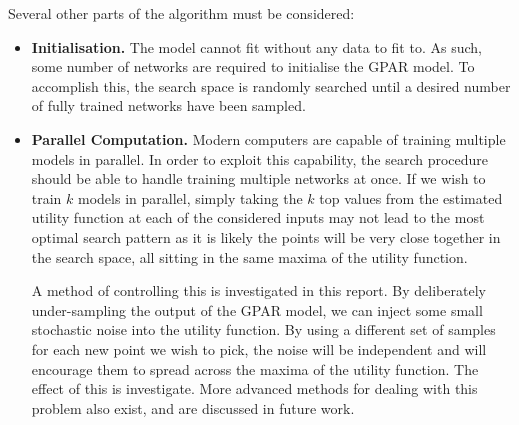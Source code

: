 Several other parts of the algorithm must be considered:
\begin{itemize}
	\item \textbf{Initialisation.} The model cannot fit without any data to fit to. As such, some number of networks are required to initialise the GPAR model. To accomplish this, the search space is randomly searched until a desired number of fully trained networks have been sampled.
	
	\item \textbf{Parallel Computation.} Modern computers are capable of training multiple models in parallel. In order to exploit this capability, the search procedure should be able to handle training multiple networks at once. If we wish to train \( k \) models in parallel, simply taking the \( k \) top values from the estimated utility function at each of the considered inputs may not lead to the most optimal search pattern as it is likely the points will be very close together in the search space, all sitting in the same maxima of the utility function. 
	
	A method of controlling this is investigated in this report. By deliberately under-sampling the output of the GPAR model, we can inject some small stochastic noise into the utility function. By using a different set of samples for each new point we wish to pick, the noise will be independent and will encourage them to spread across the maxima of the utility function. The effect of this is investigate. More advanced methods for dealing with this problem also exist, and are discussed in future work.
\end{itemize}


